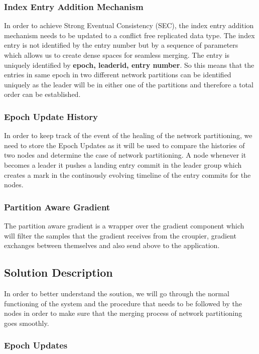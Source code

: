 \documentclass[a4paper, 11pt]{article}
\begin{document}
\subsubsection{Index Entry Addition Mechanism} In order to achieve Strong Eventual Consistency (SEC), the index entry addition mechanism needs to be updated to a conflict free replicated data type. The index entry is not identified by the entry number but by a sequence of parameters which allows us to create dense spaces for seamless merging.
The entry is uniquely identified by \textbf{epoch, leaderid, entry number}. So this means that the entries in same epoch in two different network partitions can be identified uniquely as the leader will be in either one of the partitions and therefore a total order can be established.


\subsubsection{Epoch Update History} In order to keep track of the event of the healing of the network partitioning, we need to store the Epoch Updates as it will be used to compare the histories of two nodes and determine the case of network partitioning. A node whenever it becomes a leader it pushes a landing entry commit in the leader group which creates a mark in the continously evolving timeline of the entry commits for the nodes.


\subsubsection{Partition Aware Gradient} The partition aware gradient is a wrapper over the gradient component which will filter the samples that the gradient receives from the croupier, gradient exchanges between themselves and also send above to the application.



\subsection{Solution Description}
In order to better understand the soution, we will go through the normal functioning of the system and the procedure that needs to be followed by the nodes in order to make sure that the merging process of network partitioning goes smoothly.

\subsubsection{Epoch Updates}
\end{document}
